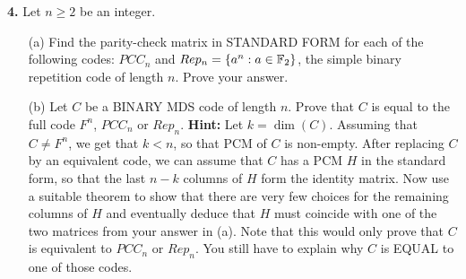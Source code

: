 \documentclass[12pt]{amsart}
\begin{document}
{\bf 4.} Let $n\geq 2$ be an integer.
\begin{itemize}
\item[(a)] Find the parity-check matrix in STANDARD FORM for each of the following codes: $PCC_n$ and $Rep_n=\{a^n: a\in {\mathbb F}_2\}$, the simple binary repetition code of length $n$. Prove your answer.
\item[(b)] Let $C$ be a BINARY MDS code of length $n$. Prove that $C$ is equal to the full code $F^n$, $PCC_n$ or $Rep_n$.
{\bf Hint:} Let $k=\dim(C)$. Assuming that $C\neq F^n$, we get that $k<n$, so that PCM of $C$ is non-empty. After replacing 
$C$ by an equivalent code, we can assume that $C$ has a PCM $H$ in the standard form, so that the last $n-k$ columns of $H$
form the identity matrix. Now use a suitable theorem to show that there are very few choices for the remaining columns of $H$
and eventually deduce that $H$ must coincide with one of the two matrices from your answer in (a). Note that this would only prove that $C$ is equivalent to $PCC_n$ or $Rep_n$. You still have to explain why $C$ is EQUAL to one of those codes.
\end{itemize}
\newpage
\end{document}
